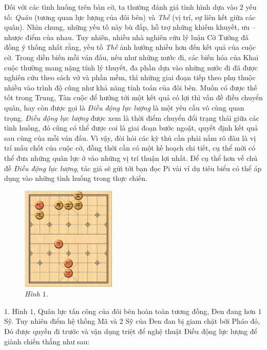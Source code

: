 \vspace*{185pt}
\begin{multicols}{2}	
	Đối với các tình huống trên bàn cờ, ta thường đánh giá tình hình dựa vào $2$ yếu tố: \textit{Quân} (tương quan lực lượng của đôi bên) và \textit{Thế} (vị trí, sự liên kết giữa các quân). Nhìn chung, những yếu tố này bù đắp, hỗ trợ những khiếm khuyết, ưu -- nhược điểm của nhau. Tuy nhiên, nhiều nhà nghiên cứu lý luận Cờ Tướng đã đồng ý thống nhất rằng, yếu tố \textit{Thế} ảnh hưởng nhiều hơn đến kết quả của cuộc cờ. Trong diễn biến mỗi ván đấu, nếu như những nước đi, các biến hóa của Khai cuộc thường mang nặng tính lý thuyết, đa phần dựa vào những nước đi đã được nghiên cứu theo sách vở và phần mềm, thì những giai đoạn tiếp theo phụ thuộc nhiều vào trình độ cũng như khả năng tính toán của đôi bên. Muốn có được thế tốt trong Trung, Tàn cuộc để hướng tới một kết quả có lợi thì vấn đề điều chuyển quân, hay còn được gọi là \textit{Điều động lực lượng} là một yêu cầu vô cùng quan trọng.
	\vskip 0.1cm
	\textit{Điều động lực lượng} được xem là thời điểm chuyển đổi trạng thái giữa các tình  huống, đó cũng có thể được coi là giai đoạn bước ngoặt, quyết định kết quả sau cùng của mỗi ván đấu. Vì vậy, đòi hỏi các kỳ thủ cần phải nắm rõ đâu là vị trí mấu chốt của cuộc cờ, đồng thời cần có một kế hoạch chi tiết, cụ thể mới có thể đưa những quân lực ở vào những vị trí thuận lợi nhất. 
	\vskip 0.1cm
	Để cụ thể hơn về chủ đề \textit{Điều động lực lượng}, tác giả sẽ gửi tới bạn đọc Pi vài ví dụ tiêu biểu có thể áp dụng vào những tình huống trong thực chiến.
	\begin{figure}[H]
		\vspace*{-5pt}
		\centering
		\captionsetup{labelformat= empty, justification=centering}
		\includegraphics[width= 0.4\textwidth]{1}
		\caption{\small\textit{\color{gocco}Hình $1$.}}
		\vspace*{-10pt}
	\end{figure}
	$1.$ Hình $1$, Quân lực tấn công của đôi bên hoàn toàn tương đồng,  Đen đang hơn $1$ Sỹ. Tuy nhiên điểm hệ thống Mã và $2$ Sỹ của Đen đan bị giam chặt bởi Pháo đỏ, Đỏ được quyền đi trước và vận dụng triệt để nghệ thuật Điều động lực lượng để giành chiến thắng như sau:

\end{multicols}
